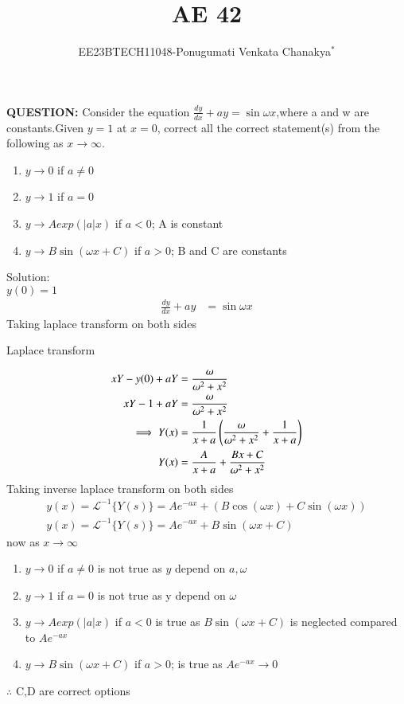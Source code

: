 \documentclass[journal,12pt,twocolumn]{IEEEtran}
\theoremstyle{remark}
\begin{document}
 
 \vspace{3cm}
 \title{\textbf{AE 42}}
 \author{EE23BTECH11048-Ponugumati Venkata Chanakya$^{*}$%
 }
 \maketitle
 \newpage
 \bigskip
 \renewcommand{\thefigure}{\theenumi}
 \renewcommand{\thetable}{\theenumi}
 \textbf{QUESTION:}
Consider the equation $\frac{dy}{dx}+ay=\sin{\omega x}$,where a and w are constants.Given $y=1$ at $x=0$, correct all the correct statement(s) from the following as $x\to \infty$.
\begin{enumerate}

  \item  $y \to 0$ if $a \neq 0$ \\ 
  \item $y \to 1$ if $a = 0$\\
  \item $y \to Aexp(|a|x)$ if $a < 0$; A is constant\\
  \item $y \to B \sin(\omega x+C)$ if $a>0$; B and C are constants\
      
\end{enumerate}
Solution: \\
  $y(0)=1$
\begin{align}
 \frac{dy}{dx}+ay &= \sin{\omega x}
\end{align}
 Taking laplace transform on both sides 
  \begin{table}[!ht]
    \centering
        
    \caption{Laplace transform}
    \label{tab:Gate AE 42 }
\end{table}
\begin{align}
    xY-y(0)+aY &= \frac{\omega}{\omega^2+x^2}\\
    xY-1+aY &= \frac{\omega}{\omega^2+x^2}\\
    \implies Y(x)&=\frac{1}{x+a} \left(\frac{\omega}{\omega^2+x^2}+\frac{1}{x+a}\right)\\
     Y(x)&=\frac{A}{x+a} +\frac{Bx+C}{\omega^2+x^2}
 \end{align}
 Taking inverse laplace transform on both sides 
 \begin{align}
      y(x) = \mathcal{L}^{-1}\{Y(s)\} = A e^{-ax} + (B\cos(\omega x) + C\sin(\omega x))\\
       y(x) = \mathcal{L}^{-1}\{Y(s)\} = A e^{-ax} + B\sin(\omega x+C)
 \end{align}
 now as $x\to \infty$
 \begin{enumerate}
     \item $y \to 0$ if $a \neq 0$ is not true as $y$ depend on $a,\omega$
     \item $y \to 1 $ if $ a=0$ is not true as y depend on $\omega$
     \item $y \to Aexp(|a|x)$ if $a < 0$ is true as $ B\sin(\omega x+C)$ is neglected compared to $A e^{-ax}$
     \item $y \to B \sin(\omega x+C)$ if $a>0$; is true as $A e^{-ax} \to 0$ 
     
 \end{enumerate}
  $\therefore$ C,D are correct options
 
 
\end{document}
